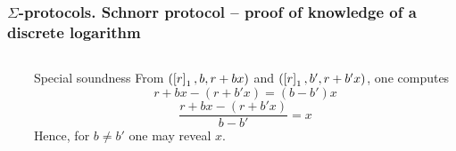 \documentclass[aspectratio=169]{beamer}
\begin{document}
\begin{frame}
  \frametitle{$\Sigma$-protocols. Schnorr protocol -- proof of knowledge of a discrete logarithm}
  \begin{columns}
    \begin{column}{.5\linewidth}
    \end{column}
    \begin{column}{.5\linewidth}
      \begin{block}{Special soundness}
        From $(\left[r\right]_{1}, b, r + bx)$ and $(\left[r\right]_{1}, b', r + b'x)$, one computes
        \[
          r + bx - (r + b'x)  = (b - b')x
        \]
        \[
          \frac{r + bx - (r + b'x)}{b - b'} = x
        \]
        Hence, for $b \neq b'$ one may reveal $x$.
      \end{block}
    \end{column}
  \end{columns}
\end{frame}
\end{document}
